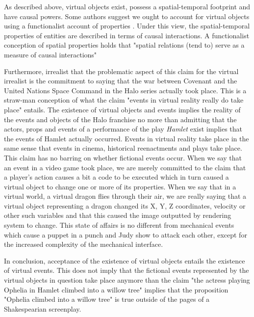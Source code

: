  As described above, virtual objects exist, possess a spatial-temporal footprint and have causal powers. Some authors suggest we ought to account for virtual objects using a functionalist account of properties \cite{ChalmersVR}. Under this view, the spatial-temporal properties of entities are described in terms of causal interactions. A functionalist conception of spatial properties holds that "spatial relations (tend to) serve as a measure of causal
interactions" \cite{ChalmersVR} 

   Furthermore, irrealist that the problematic aspect of this claim for the virtual irrealist is the commitment to saying that the war between Covenant and the United Nations Space Command in the Halo series actually took place. This is a straw-man conception of what the claim "events in virtual reality really do take place" entails. The existence of virtual objects and events implies the reality of the events and objects of the Halo franchise no more than admitting that the actors, props and events of a performance of the play \textit{Hamlet} exist implies that the events of Hamlet actually occurred. Events in virtual reality take place in the same sense that events in cinema, historical reenactments and plays take place. This claim has no barring on whether fictional events occur. When we say that an event in a video game took place, we are merely committed to the claim that a player's action causes a bit a code to be executed which in turn caused a virtual object to change one or more of its properties. When we say that in a  virtual world, a virtual dragon flies through their air, we are really saying that a virtual object representing a dragon changed its X, Y, Z coordinates, velocity or other such variables and that this caused the image outputted by rendering system to change. This state of affairs is no different from mechanical events which cause a puppet in a punch and Judy show to attack each other, except for the increased complexity of the mechanical interface. 

In conclusion, acceptance of the existence of virtual objects entails the existence of virtual events. This does not imply that the fictional events represented by the virtual objects in question take place anymore than the claim "the actress playing Ophelia in Hamlet climbed into a willow tree" implies that the proposition "Ophelia  climbed into a willow tree" is true outside of the pages of a Shakespearian screenplay.   

